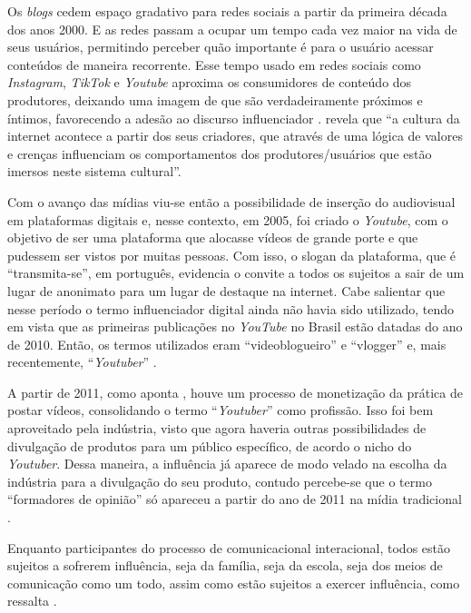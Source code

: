 \documentclass[portuguese]{textolivre}
\begin{document}
Os \textit{blogs} cedem espaço gradativo para redes sociais a partir da primeira década dos anos 2000. E as redes passam a ocupar um tempo cada vez maior na vida de seus usuários, permitindo perceber quão importante é para o usuário acessar conteúdos de maneira recorrente. Esse tempo usado em redes sociais como \textit{Instagram}, \textit{TikTok} e \textit{Youtube} aproxima os consumidores de conteúdo dos produtores, deixando uma imagem de que são verdadeiramente próximos e íntimos, favorecendo a adesão ao discurso influenciador \cite{yunes_representacoes_2019}. \textcite[p. 37]{castells_internet_2002} revela que “a cultura da internet acontece a partir dos seus criadores, que através de uma lógica de valores e crenças influenciam os comportamentos dos produtores/usuários que estão imersos neste sistema cultural”. 

Com o avanço das mídias viu-se então a possibilidade de inserção do audiovisual em plataformas digitais e, nesse contexto, em 2005, foi criado o \textit{Youtube}, com o objetivo de ser uma plataforma que alocasse vídeos de grande porte e que pudessem ser vistos por muitas pessoas. Com isso, o slogan da plataforma, que é “transmita-se”, em português, evidencia o convite a todos os sujeitos a sair de um lugar de anonimato para um lugar de destaque na internet. Cabe salientar que nesse período o termo influenciador digital ainda não havia sido utilizado, tendo em vista que as primeiras publicações no \textit{YouTube} no Brasil estão datadas do ano de 2010. Então, os termos utilizados eram “videoblogueiro” e “vlogger” e, mais recentemente, “\textit{Youtuber}” \cite{karhawi_influenciadores_2017}.

A partir de 2011, como aponta \textcite{karhawi_influenciadores_2017}, houve um processo de monetização da prática de postar vídeos, consolidando o termo “\textit{Youtuber}” como profissão. Isso foi bem aproveitado pela indústria, visto que agora haveria outras possibilidades de divulgação de produtos para um público específico, de acordo o nicho do \textit{Youtuber}. Dessa maneira, a influência já aparece de modo velado na escolha da indústria para a divulgação do seu produto, contudo percebe-se que o termo “formadores de opinião” só apareceu a partir do ano de 2011 na mídia tradicional \cite{karhawi_influenciadores_2017}.

Enquanto participantes do processo de comunicacional interacional, todos estão sujeitos a sofrerem influência, seja da família, seja da escola, seja dos meios de comunicação como um todo, assim como estão sujeitos a exercer influência, como ressalta \textcite{azevedo_agendamento_2004}.
\end{document}
